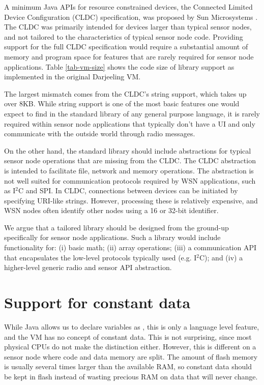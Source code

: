 A minimum Java APIs for resource constrained devices, the Connected Limited Device Configuration (CLDC) specification, was proposed by Sun Microsystems \cite{CLDC}. The CLDC was primarily intended for devices larger than typical sensor nodes, and not tailored to the characteristics of typical sensor node code. Providing support for the full CLDC specification would require a substantial amount of memory and program space for features that are rarely required for sensor node applications. Table \ref{tab-vm-size} shows the code size of library support as implemented in the original Darjeeling VM.

The largest mismatch comes from the CLDC's string support, which takes up over 8KB. While string support is one of the most basic features one would expect to find in the standard library of any general purpose language, it is rarely required within sensor node applications that typically don't have a UI and only communicate with the outside world through radio messages.

On the other hand, the standard library should include abstractions for typical sensor node operations that are missing from the CLDC. The CLDC  abstraction is intended to facilitate file, network and memory operations. The abstraction is not well suited for communication protocols required by WSN applications, such as I$^{2}$C and SPI. In CLDC, connections between devices can be initiated by specifying URI-like strings. However, processing these is relatively expensive, and WSN nodes often identify other nodes using a 16 or 32-bit identifier.

We argue that a tailored library should be designed from the ground-up specifically for sensor node applications. Such a library would include functionality for: (i) basic math; (ii) array operations; (iii) a communication API that encapsulates the low-level protocols typically used (e.g. I$^{2}$C); and (iv) a higher-level generic radio and sensor API abstraction.




\section{Support for constant data}
\label{sec-const-data}
While Java allows us to declare variables as , this is only a language level feature, and the VM has no concept of constant data. This is not surprising, since most physical CPUs do not make the distinction either. However, this is different on a sensor node where code and data memory are split. The amount of flash memory is usually several times larger than the available RAM, so constant data should be kept in flash instead of wasting precious RAM on data that will never change.

